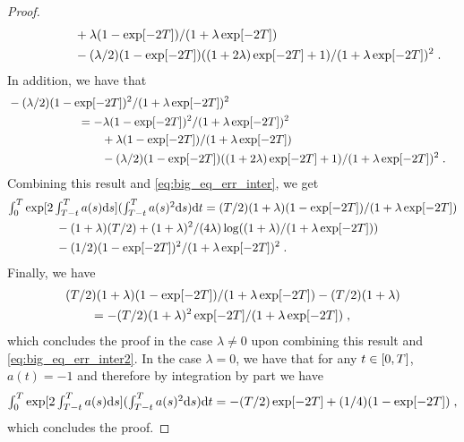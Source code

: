 \begin{proof}
\begin{align}
    & \qquad \qquad +\lambda(1 - \exp[-2T])/(1 + \lambda \exp[-2T]) \\
    & \qquad \qquad -(\lambda/2)(1-\exp[-2T])((1+2\lambda)\exp[-2T] +1)/(1 + \lambda \exp[-2T])^2 \; . \label{eq:big_eq_err_inter}
  \end{align}
  In addition, we have that
  \begin{align}
    &-(\lambda/2)(1-\exp[-2T])^2/(1 + \lambda \exp[-2T])^2 & \\
    &\qquad \qquad \qquad = - \lambda(1- \exp[-2T])^2/(1 + \lambda \exp[-2T])^2 \\
                                                                            & \qquad \qquad \qquad \qquad +\lambda(1 - \exp[-2T])/(1 + \lambda \exp[-2T]) \\
    & \qquad \qquad \qquad \qquad -(\lambda/2)(1-\exp[-2T])((1+2\lambda)\exp[-2T] +1)/(1 + \lambda \exp[-2T])^2 \; .
  \end{align}
  Combining this result and \eqref{eq:big_eq_err_inter}, we get
  \begin{align}
    &\textstyle{\int_0^T \exp[2\int_{T-t}^T a(s) \mathrm{d}s] (\int_{T-t}^T a(s)^2 \mathrm{d}s) \mathrm{d}t} = (T/2)(1+\lambda)(1-\exp[-2T])/(1+\lambda \exp[-2T]) \\
                                                                                             & \qquad \qquad - (1 + \lambda)(T/2) + (1+\lambda)^2/(4\lambda)\log((1+\lambda)/(1 + \lambda \exp[-2T])) \\
    & \qquad \qquad -(1/2)(1-\exp[-2T])^2/(1 + \lambda \exp[-2T])^2 \; . \label{eq:big_eq_err_inter2}
  \end{align}
  Finally, we have
  \begin{align}
    &(T/2)(1+\lambda)(1-\exp[-2T])/(1+\lambda \exp[-2T]) - (T/2)(1+\lambda) \\
    &\qquad = - (T/2)(1+\lambda)^2\exp[-2T]/(1+\lambda\exp[-2T]) \; ,
  \end{align}
  which concludes the proof in the case $\lambda \neq 0$ upon combining this
  result and \eqref{eq:big_eq_err_inter2}. In the case $\lambda = 0$, we have that
  for any $t \in \left[0,T\right]$, $a(t) = -1$ and therefore by integration by part
  we have
    \begin{equation}
      \textstyle{\int_0^T \exp[2\int_{T-t}^T a(s) \mathrm{d}s] (\int_{T-t}^T a(s)^2 \mathrm{d}s) \mathrm{d}t} = -(T/2) \exp[-2T] + (1/4)(1 - \exp[-2T]) \; ,
    \end{equation}
    which concludes the proof.

\end{proof}
